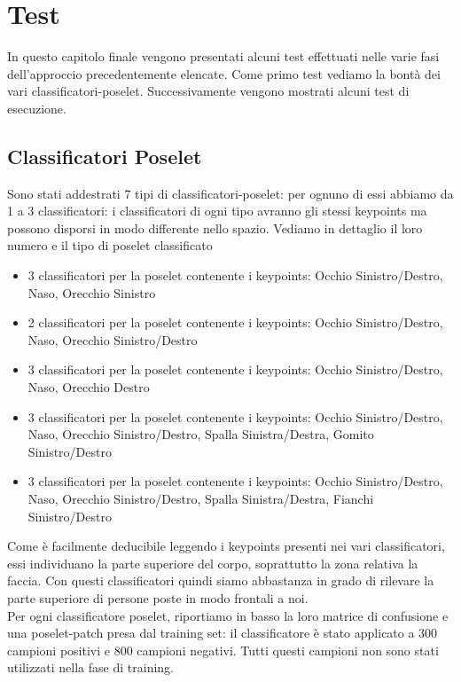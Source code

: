 \chapter{Test} \label{cap4}
In questo capitolo finale vengono presentati alcuni test effettuati nelle varie fasi dell'approccio precedentemente elencate. Come primo test vediamo la bontà dei vari classificatori-poselet. Successivamente vengono mostrati alcuni test di esecuzione.

\section{Classificatori Poselet}
Sono stati addestrati 7 tipi di classificatori-poselet: per ognuno di essi abbiamo da 1 a 3 classificatori: i classificatori di ogni tipo avranno gli stessi keypoints ma possono disporsi in modo differente nello spazio. Vediamo in dettaglio il loro numero e il tipo di poselet classificato

\begin{itemize}
\item 3 classificatori per la poselet contenente i keypoints: Occhio Sinistro/Destro, Naso, Orecchio Sinistro %
\item 2 classificatori per la poselet contenente i keypoints: Occhio Sinistro/Destro, Naso, Orecchio Sinistro/Destro %
\item 3 classificatori per la poselet contenente i keypoints: Occhio Sinistro/Destro, Naso, Orecchio Destro %
\item 3 classificatori per la poselet contenente i keypoints: Occhio Sinistro/Destro, Naso, Orecchio Sinistro/Destro, Spalla Sinistra/Destra, Gomito Sinistro/Destro %
\item 3 classificatori per la poselet contenente i keypoints: Occhio Sinistro/Destro, Naso, Orecchio Sinistro/Destro, Spalla Sinistra/Destra, Fianchi Sinistro/Destro %
\end{itemize}

Come è facilmente deducibile leggendo i keypoints presenti nei vari classificatori, essi individuano la parte superiore del corpo, soprattutto la zona relativa la faccia. Con questi classificatori quindi siamo abbastanza in grado di rilevare la parte superiore di persone poste in modo frontali a noi.\\
Per ogni classificatore poselet, riportiamo in basso la loro matrice di confusione e una poselet-patch presa dal training set: il classificatore è stato applicato a 300 campioni positivi e 800 campioni negativi. Tutti questi campioni non sono stati utilizzati nella fase di training. 

